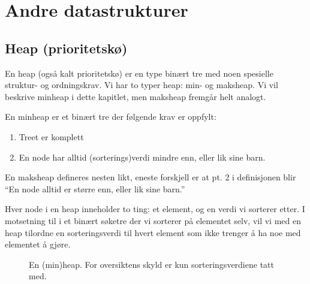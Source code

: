 \section{Andre datastrukturer}

\subsection{Heap (prioritetskø)}\label{heap}
En heap (også kalt prioritetskø) er en type binært tre med noen spesielle struktur- og ordningskrav. Vi har to typer heap: min- og maksheap. Vi vil beskrive minheap i dette kapitlet, men maksheap fremgår helt analogt.

\begin{definition} En minheap er et binært tre der følgende krav er oppfylt:  \label{def:heap}
\begin{enumerate}
\item Treet er komplett
\item En node har alltid (sorterings)verdi mindre enn, eller lik sine barn. 
\end{enumerate}
\end{definition}

En maksheap defineres nesten likt, eneste forskjell er at pt. 2 i definisjonen blir ``En node alltid er større enn, eller lik sine barn.''

Hver node i en heap inneholder to ting: et element, og en verdi vi sorterer etter. I motsetning til i et binært søketre der vi sorterer på elementet selv, vil vi med en heap tilordne en sorteringsverdi til hvert element som ikke trenger å ha noe med elementet å gjøre. 


\begin{figure}[H]
\centering
\caption{En (min)heap. For oversiktens skyld er kun sorteringsverdiene tatt med.}
\label{fig:heap}
\end{figure}


